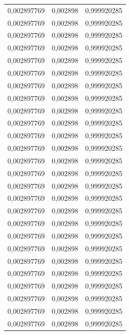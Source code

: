 \begin{center}
\begin{longtable}{|l|l|l|}
0,002897769        & 0,002898              & 0,999920285  \\
0,002897769        & 0,002898              & 0,999920285  \\
0,002897769        & 0,002898              & 0,999920285  \\
0,002897769        & 0,002898              & 0,999920285  \\
0,002897769        & 0,002898              & 0,999920285  \\
0,002897769        & 0,002898              & 0,999920285  \\
0,002897769        & 0,002898              & 0,999920285  \\
0,002897769        & 0,002898              & 0,999920285  \\
0,002897769        & 0,002898              & 0,999920285  \\
0,002897769        & 0,002898              & 0,999920285  \\
0,002897769        & 0,002898              & 0,999920285  \\
0,002897769        & 0,002898              & 0,999920285  \\
0,002897769        & 0,002898              & 0,999920285  \\
0,002897769        & 0,002898              & 0,999920285  \\
0,002897769        & 0,002898              & 0,999920285  \\
0,002897769        & 0,002898              & 0,999920285  \\
0,002897769        & 0,002898              & 0,999920285  \\
0,002897769        & 0,002898              & 0,999920285  \\
0,002897769        & 0,002898              & 0,999920285  \\
0,002897769        & 0,002898              & 0,999920285  \\
0,002897769        & 0,002898              & 0,999920285  \\
0,002897769        & 0,002898              & 0,999920285  \\
0,002897769        & 0,002898              & 0,999920285  \\
0,002897769        & 0,002898              & 0,999920285  \\
0,002897769        & 0,002898              & 0,999920285  \\
0,002897769        & 0,002898              & 0,999920285  \\

\end{longtable}
\end{center}
